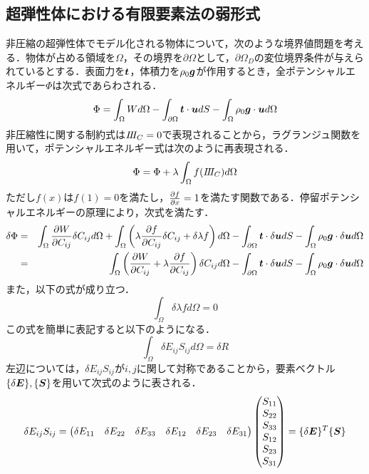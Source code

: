 \subsection{超弾性体における有限要素法の弱形式}
非圧縮の超弾性体でモデル化される物体について，次のような境界値問題を考える．物体が占める領域を$ \Omega $，その境界を$ \partial \Omega $として，$ \partial \Omega_D $の変位境界条件が与えられているとする．表面力を$ {\mbox{\boldmath $t$}} $，体積力を$ \rho_0 {\mbox{\boldmath $g$}} $が作用するとき，全ポテンシャルエネルギー$ \Phi $は次式であらわされる．
\begin{equation}\label{eq:PotentialEq}
	\Phi = \int_{\Omega} W d\Omega - \int_{\partial \Omega} {\mbox{\boldmath $t$}} \cdot {\mbox{\boldmath $u$}} dS - \int_{\Omega} \rho_0{\mbox{\boldmath $g$}} \cdot {\mbox{\boldmath $u$}} d\Omega
\end{equation}
非圧縮性に関する制約式は$ I\hspace{-.2em}I\hspace{-.2em}I_C = 0 $で表現されることから，ラグランジュ関数を用いて，ポテンシャルエネルギー式は次のように再表現される．
\begin{equation}\label{eq:PotentialReEq}
	\Phi = \Phi + \lambda \int_{\Omega} f(I\hspace{-.2em}I\hspace{-.2em}I_C) d\Omega
\end{equation}
ただし$ f(x) $は$ f(1)=0 $を満たし，$ \frac{\partial f}{\partial x}=1 $を満たす関数である．停留ポテンシャルエネルギーの原理により，次式を満たす．
\begin{eqnarray}\label{eq:DeltaPotentialEq}
	\delta \Phi &=& \int_{\Omega} \frac{\partial W}{\partial C_{ij}} \delta C_{ij} d\Omega + \int_{\Omega} \left( \lambda \frac{\partial f}{\partial C_{ij}} \delta C_{ij} + \delta \lambda f \right)d \Omega -\int_{\partial \Omega} {\mbox{\boldmath $t$}}\cdot \delta {\mbox{\boldmath $u$}} dS - \int_{\Omega} \rho_0 {\mbox{\boldmath $g$}} \cdot \delta {\mbox{\boldmath $u$}} d\Omega \\
	&=& \int_{\Omega} \left( \frac{\partial W}{\partial C_{ij}} + \lambda \frac{\partial f}{\partial C_{ij}}\right) \delta C_{ij} d\Omega -  \int_{\partial \Omega} {\mbox{\boldmath $t$}} \cdot \delta {\mbox{\boldmath $u$}} dS - \int_{\Omega} \rho_0{\mbox{\boldmath $g$}} \cdot \delta {\mbox{\boldmath $u$}} d\Omega
\end{eqnarray}
また，以下の式が成り立つ．
\begin{equation}\label{eq:ConstraintEq}
	\int_{\Omega} \delta \lambda f d\Omega =0
\end{equation}
この式を簡単に表記すると以下のようになる．
\begin{equation}\label{eq:SimplyPotential}
	\int_{\Omega} \delta E_{ij} S_{ij} d\Omega = \delta R
\end{equation}
左辺については，$ \delta E_{ij} S_{ij} $が$ i,j $に関して対称であることから，要素ベクトル$ \{\delta {\mbox{\boldmath $E$}} \},\{{\mbox{\boldmath $S$}} \} $を用いて次式のように表される．
\begin{equation}\label{eq:Tensor_to_Vector}
	\delta E_{ij} S_{ij} = \begin{pmatrix} \delta E_{11}&\delta E_{22} & \delta E_{33} & \delta E_{12} & \delta E_{23} & \delta E_{31}  \end{pmatrix} \begin{pmatrix} S_{11}\\S_{22} \\ S_{33} \\ S_{12} \\ S_{23} \\ S_{31}  \end{pmatrix} = \{\delta {\mbox{\boldmath $E$}} \}^T \{{\mbox{\boldmath $S$}} \}
\end{equation}
